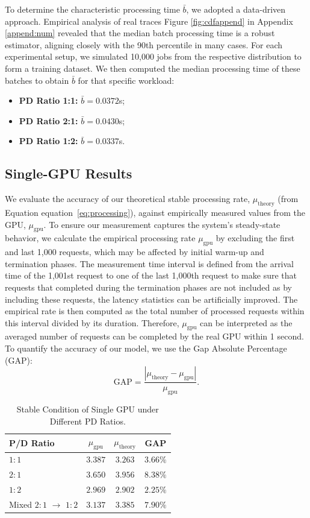 \documentclass{article}
\def\eqref#1{equation~\ref{#1}}
\theoremstyle{plain}
\theoremstyle{definition}
\theoremstyle{remark}
\begin{document}
To determine the characteristic processing time $\bar{b}$, we adopted a data-driven approach. Empirical analysis of real traces Figure \ref{fig:cdfappend} in Appendix \ref{append:num} revealed that the median batch processing time is a robust estimator, aligning closely with the 90th percentile in many cases. For each experimental setup, we simulated 10,000 jobs from the respective distribution to form a training dataset. We then computed the median processing time of these batches to obtain $\bar{b}$ for that specific workload:
\begin{itemize}
    \item \textbf{PD Ratio 1:1: }  $\bar{b} = 0.0372$s;
    \item \textbf{PD Ratio 2:1: }  $\bar{b} = 0.0430$s; 
    \item \textbf{PD Ratio 1:2: }  $\bar{b} = 0.0337$s.
\end{itemize}

\subsection{Single-GPU Results}
\label{subsec:single-GPU}
We evaluate the accuracy of our theoretical stable processing rate, $\mu_{\text{theory}}$ (from Equation \eqref{eq:processing}), against empirically measured values from the GPU, $\mu_{\text{gpu}}$. To ensure our measurement captures the system's steady-state behavior, we calculate the empirical processing rate $\mu_{\text{gpu}}$ by excluding the first and last 1,000 requests, which may be affected by initial warm-up and termination phases. The measurement time interval is defined from the arrival time of the 1,001st request to one of the last 1,000th request to make sure that requests that completed during the termination phases are not included as by including these requests, the latency statistics can be artificially improved. The empirical rate is then computed as the total number of processed requests within this interval divided by its duration. Therefore, $\mu_{\text{gpu}}$ can be interpreted as the averaged number of requests can be completed by the real GPU within 1 second. To quantify the accuracy of our model, we use the Gap Absolute Percentage (GAP):
\[
\text{GAP} = \frac{|\mu_{\text{theory}} - \mu_{\text{gpu}}|}{\mu_{\text{gpu}}}.
\]




\begin{table}[h]
\centering
\caption{Stable Condition of Single GPU under Different PD Ratios. }
\label{tab:stable_condition}
\begin{tabular}{lccc}
\toprule
\textbf{P/D Ratio} & \textbf{$\mu_{\text{gpu}}$} & \textbf{$\mu_{\text{theory}}$} & \textbf{GAP} \\
\midrule
$1:1$ & $3.387$ & $3.263$ & $3.66\%$ \\
$2:1$ & $3.650$ & $3.956$ & $8.38\%$ \\
$1:2$ & $2.969$ & $2.902$ & $2.25\%$ \\
Mixed $2:1$ $\to$ $1:2$ & $3.137$ & $3.385$ & $7.90\%$ \\
\bottomrule
\end{tabular}
\end{table}
\end{document}
